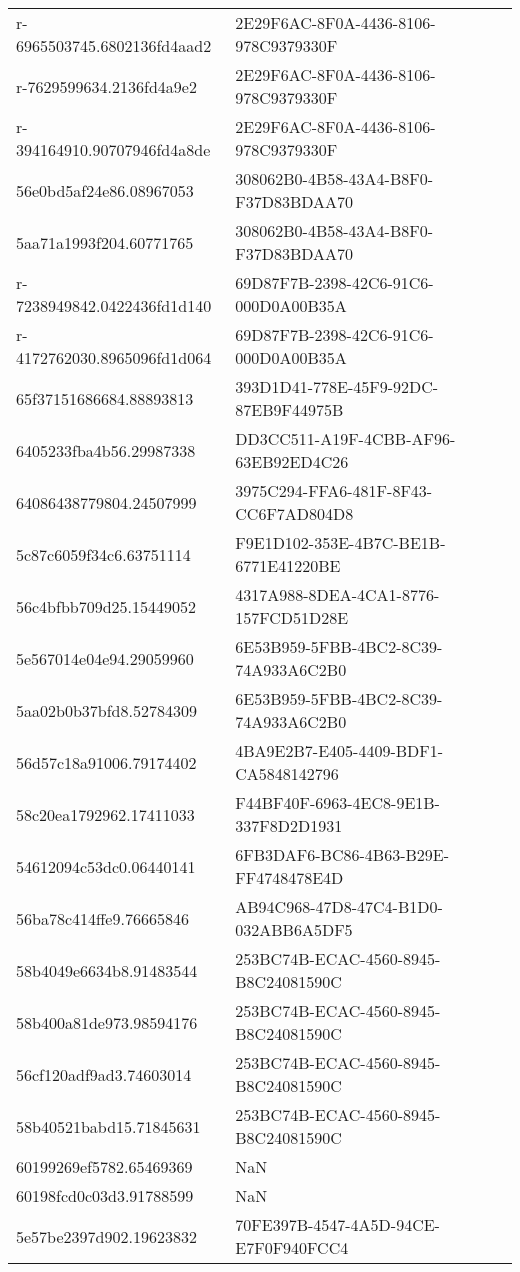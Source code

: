 \begin{tabular}{ll}
r-6965503745.6802136fd4aad2 & 2E29F6AC-8F0A-4436-8106-978C9379330F \\
r-7629599634.2136fd4a9e2 & 2E29F6AC-8F0A-4436-8106-978C9379330F \\
r-394164910.90707946fd4a8de & 2E29F6AC-8F0A-4436-8106-978C9379330F \\
56e0bd5af24e86.08967053 & 308062B0-4B58-43A4-B8F0-F37D83BDAA70 \\
5aa71a1993f204.60771765 & 308062B0-4B58-43A4-B8F0-F37D83BDAA70 \\
r-7238949842.0422436fd1d140 & 69D87F7B-2398-42C6-91C6-000D0A00B35A \\
r-4172762030.8965096fd1d064 & 69D87F7B-2398-42C6-91C6-000D0A00B35A \\
65f37151686684.88893813 & 393D1D41-778E-45F9-92DC-87EB9F44975B \\
6405233fba4b56.29987338 & DD3CC511-A19F-4CBB-AF96-63EB92ED4C26 \\
64086438779804.24507999 & 3975C294-FFA6-481F-8F43-CC6F7AD804D8 \\
5c87c6059f34c6.63751114 & F9E1D102-353E-4B7C-BE1B-6771E41220BE \\
56c4bfbb709d25.15449052 & 4317A988-8DEA-4CA1-8776-157FCD51D28E \\
5e567014e04e94.29059960 & 6E53B959-5FBB-4BC2-8C39-74A933A6C2B0 \\
5aa02b0b37bfd8.52784309 & 6E53B959-5FBB-4BC2-8C39-74A933A6C2B0 \\
56d57c18a91006.79174402 & 4BA9E2B7-E405-4409-BDF1-CA5848142796 \\
58c20ea1792962.17411033 & F44BF40F-6963-4EC8-9E1B-337F8D2D1931 \\
54612094c53dc0.06440141 & 6FB3DAF6-BC86-4B63-B29E-FF4748478E4D \\
56ba78c414ffe9.76665846 & AB94C968-47D8-47C4-B1D0-032ABB6A5DF5 \\
58b4049e6634b8.91483544 & 253BC74B-ECAC-4560-8945-B8C24081590C \\
58b400a81de973.98594176 & 253BC74B-ECAC-4560-8945-B8C24081590C \\
56cf120adf9ad3.74603014 & 253BC74B-ECAC-4560-8945-B8C24081590C \\
58b40521babd15.71845631 & 253BC74B-ECAC-4560-8945-B8C24081590C \\
60199269ef5782.65469369 & NaN \\
60198fcd0c03d3.91788599 & NaN \\
5e57be2397d902.19623832 & 70FE397B-4547-4A5D-94CE-E7F0F940FCC4 \\

\end{tabular}
